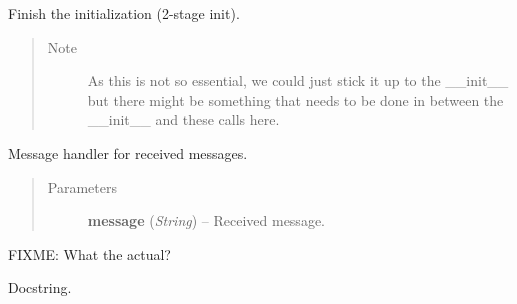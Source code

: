 \documentclass[letterpaper,10pt,english]{sphinxmanual}
\begin{document}
\begin{fulllineitems}
\begin{fulllineitems}
\end{fulllineitems}


\begin{fulllineitems}
\label{state:state.State.initialize}
Finish the initialization (2-stage init).
\begin{quote}\begin{description}
\item[{Note }] \leavevmode
As this is not so essential, we could just stick it up to
the \_\_init\_\_ but there might be something that needs to be
done in between the \_\_init\_\_ and these calls here.

\end{description}\end{quote}

\end{fulllineitems}


\begin{fulllineitems}
\label{state:state.State.message_handler}
Message handler for received messages.
\begin{quote}\begin{description}
\item[{Parameters}] \leavevmode
\textbf{message} (\emph{String}) -- Received message.

\end{description}\end{quote}

\end{fulllineitems}


\begin{fulllineitems}
\label{state:state.State.node_id}
FIXME: What the actual?

\end{fulllineitems}


\begin{fulllineitems}
\label{state:state.State.on_project_selected}
Docstring.


\end{fulllineitems}
\end{fulllineitems}
\end{document}
